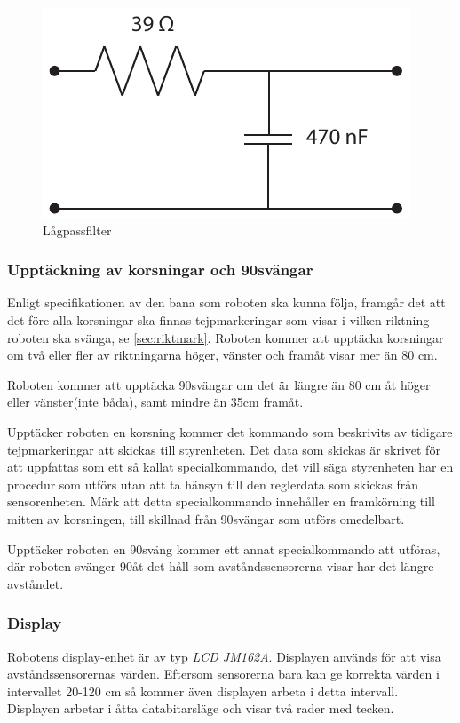 \begin{figure}[H]
  \centering
 \includegraphics[angle=0,scale=0.7]{bilder/LPfilter.pdf}
  \caption{Lågpassfilter}
  \label{fig:lagpassfilter}
\end{figure}


\subsubsection{Upptäckning av korsningar och 90\degree svängar}
\label{sec:upptackkorsning}
Enligt specifikationen av den bana som roboten ska kunna följa, framgår det 
att det före alla korsningar ska finnas tejpmarkeringar som visar i vilken 
riktning roboten ska svänga, se \ref{sec:riktmark}. Roboten kommer att 
upptäcka korsningar om två eller fler av riktningarna höger, vänster och framåt visar 
mer än 80 cm.

Roboten kommer att upptäcka 90\degree svängar om det är längre än 80 cm åt 
höger eller vänster(inte båda), samt mindre än 35cm framåt.

Upptäcker roboten en korsning kommer det kommando som beskrivits av tidigare 
tejpmarkeringar att skickas till styrenheten. Det data som skickas är skrivet 
för att uppfattas som ett så kallat specialkommando, det vill säga 
styrenheten har en procedur som utförs utan att ta hänsyn till den reglerdata 
som skickas från sensorenheten. Märk att detta specialkommando innehåller en 
framkörning till mitten av korsningen, till skillnad från 90\degree svängar 
som utförs omedelbart.

Upptäcker roboten en 90\degree sväng kommer ett annat specialkommando att 
utföras, där roboten svänger 90\degree åt det håll som avståndssensorerna 
visar har det längre avståndet.


\subsubsection{Display}
Robotens display-enhet är av typ \emph{LCD JM162A}. Displayen används för att visa avståndssensorernas värden. Eftersom sensorerna bara kan ge korrekta värden i intervallet 20-120 cm så kommer även displayen arbeta i detta intervall. Displayen arbetar i åtta databitarsläge och visar två rader med tecken. 

